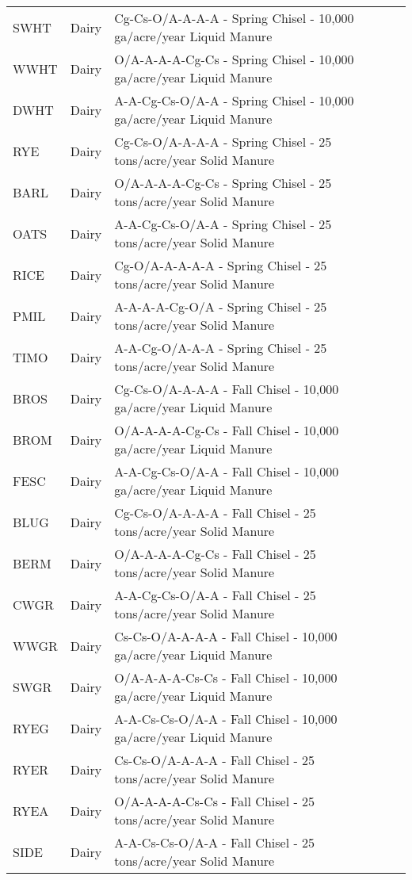 \begin{landscape}
\begin{longtable}{l l l}
	\hline	\endlastfoot
    SWHT & Dairy & Cg-Cs-O/A-A-A-A - Spring Chisel - 10,000 ga/acre/year Liquid Manure \\ 
  WWHT & Dairy & O/A-A-A-A-Cg-Cs - Spring Chisel - 10,000 ga/acre/year Liquid Manure \\ 
  DWHT & Dairy & A-A-Cg-Cs-O/A-A - Spring Chisel - 10,000 ga/acre/year Liquid Manure \\ 
  RYE & Dairy & Cg-Cs-O/A-A-A-A - Spring Chisel - 25 tons/acre/year Solid Manure \\ 
  BARL & Dairy & O/A-A-A-A-Cg-Cs - Spring Chisel - 25 tons/acre/year Solid Manure \\ 
  OATS & Dairy & A-A-Cg-Cs-O/A-A - Spring Chisel - 25 tons/acre/year Solid Manure \\ 
  RICE & Dairy & Cg-O/A-A-A-A-A - Spring Chisel - 25 tons/acre/year Solid Manure \\ 
  PMIL & Dairy & A-A-A-A-Cg-O/A - Spring Chisel - 25 tons/acre/year Solid Manure \\ 
  TIMO & Dairy & A-A-Cg-O/A-A-A - Spring Chisel - 25 tons/acre/year Solid Manure \\ 
  BROS & Dairy & Cg-Cs-O/A-A-A-A - Fall Chisel - 10,000 ga/acre/year Liquid Manure \\ 
  BROM & Dairy & O/A-A-A-A-Cg-Cs - Fall Chisel - 10,000 ga/acre/year Liquid Manure \\ 
  FESC & Dairy & A-A-Cg-Cs-O/A-A - Fall Chisel - 10,000 ga/acre/year Liquid Manure \\ 
  BLUG & Dairy & Cg-Cs-O/A-A-A-A - Fall Chisel - 25 tons/acre/year Solid Manure \\ 
  BERM & Dairy & O/A-A-A-A-Cg-Cs - Fall Chisel - 25 tons/acre/year Solid Manure \\ 
  CWGR & Dairy & A-A-Cg-Cs-O/A-A - Fall Chisel - 25 tons/acre/year Solid Manure \\ 
  WWGR & Dairy & Cs-Cs-O/A-A-A-A - Fall Chisel - 10,000 ga/acre/year Liquid Manure \\ 
  SWGR & Dairy & O/A-A-A-A-Cs-Cs - Fall Chisel - 10,000 ga/acre/year Liquid Manure \\ 
  RYEG & Dairy & A-A-Cs-Cs-O/A-A - Fall Chisel - 10,000 ga/acre/year Liquid Manure \\ 
  RYER & Dairy & Cs-Cs-O/A-A-A-A - Fall Chisel - 25 tons/acre/year Solid Manure \\ 
  RYEA & Dairy & O/A-A-A-A-Cs-Cs - Fall Chisel - 25 tons/acre/year Solid Manure \\ 
  SIDE & Dairy & A-A-Cs-Cs-O/A-A - Fall Chisel - 25 tons/acre/year Solid Manure \\ 

\end{longtable}
\end{landscape}

